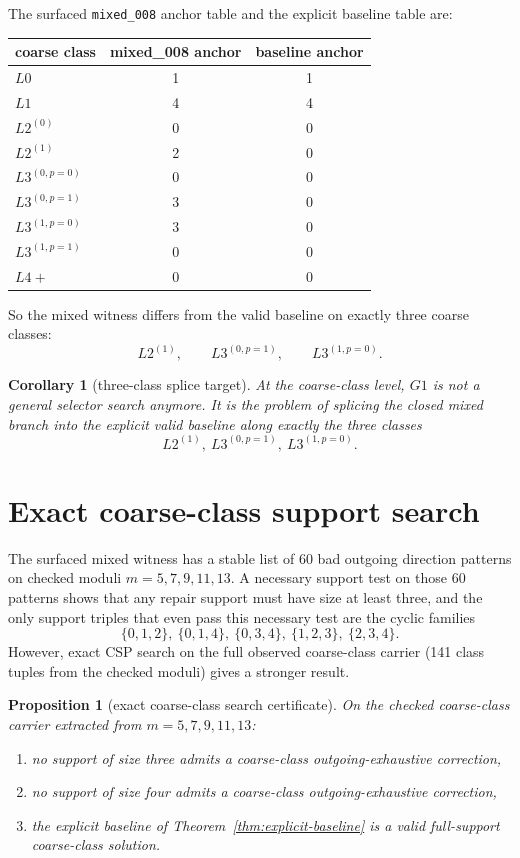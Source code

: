 \documentclass[11pt]{article}
\newtheorem{proposition}[theorem]{Proposition}
\newtheorem{corollary}[theorem]{Corollary}
\begin{document}
The surfaced \texttt{mixed\_008} anchor table and the explicit baseline table are:
\begin{center}
\begin{tabular}{@{}lcc@{}}
\toprule
coarse class & mixed\_008 anchor & baseline anchor \\
\midrule
\(L0\) & 1 & 1 \\
\(L1\) & 4 & 4 \\
\(L2^{(0)}\) & 0 & 0 \\
\(L2^{(1)}\) & 2 & 0 \\
\(L3^{(0,p=0)}\) & 0 & 0 \\
\(L3^{(0,p=1)}\) & 3 & 0 \\
\(L3^{(1,p=0)}\) & 3 & 0 \\
\(L3^{(1,p=1)}\) & 0 & 0 \\
\(L4+\) & 0 & 0 \\
\bottomrule
\end{tabular}
\end{center}
So the mixed witness differs from the valid baseline on exactly three coarse
classes:
\[
L2^{(1)},\qquad L3^{(0,p=1)},\qquad L3^{(1,p=0)}.
\]

\begin{corollary}[three-class splice target]
\label{cor:three-class-splice}
At the coarse-class level, \(G1\) is not a general selector search anymore.
It is the problem of splicing the closed mixed branch into the explicit valid
baseline along exactly the three classes
\[
L2^{(1)},\ L3^{(0,p=1)},\ L3^{(1,p=0)}.
\]
\end{corollary}

\section{Exact coarse-class support search}
The surfaced mixed witness has a stable list of 60 bad outgoing direction
patterns on checked moduli \(m=5,7,9,11,13\).
A necessary support test on those 60 patterns shows that any repair support must
have size at least three, and the only support triples that even pass this
necessary test are the cyclic families
\[
\{0,1,2\},\ \{0,1,4\},\ \{0,3,4\},\ \{1,2,3\},\ \{2,3,4\}.
\]
However, exact CSP search on the full observed coarse-class carrier (141 class
tuples from the checked moduli) gives a stronger result.

\begin{proposition}[exact coarse-class search certificate]
\label{prop:coarse-search}
On the checked coarse-class carrier extracted from
\(m=5,7,9,11,13\):
\begin{enumerate}[label=\textup{(\arabic*)},leftmargin=2.8em]
\item no support of size three admits a coarse-class outgoing-exhaustive
      correction,
\item no support of size four admits a coarse-class outgoing-exhaustive
      correction,
\item the explicit baseline of Theorem~\ref{thm:explicit-baseline} is a valid
      full-support coarse-class solution.
\end{enumerate}
\end{proposition}
\end{document}

